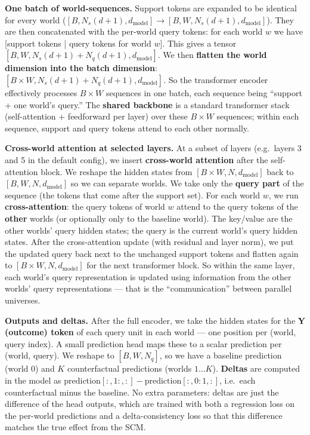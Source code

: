 \documentclass[12pt]{article}
\begin{document}
\textbf{One batch of world-sequences.} Support tokens are expanded to be identical for every world ($[B, N_s(d+1), d_{\text{model}}] \to [B, W, N_s(d+1), d_{\text{model}}]$). They are then concatenated with the per-world query tokens: for each world $w$ we have [support tokens | query tokens for world $w$]. This gives a tensor $[B, W, N_s(d+1) + N_q(d+1), d_{\text{model}}]$. We then \textbf{flatten the world dimension into the batch dimension}: $[B \times W, N_s(d+1) + N_q(d+1), d_{\text{model}}]$. So the transformer encoder effectively processes $B \times W$ sequences in one batch, each sequence being ``support + one world's query.'' The \textbf{shared backbone} is a standard transformer stack (self-attention + feedforward per layer) over these $B \times W$ sequences; within each sequence, support and query tokens attend to each other normally.

\textbf{Cross-world attention at selected layers.} At a subset of layers (e.g.\ layers 3 and 5 in the default config), we insert \textbf{cross-world attention} after the self-attention block. We reshape the hidden states from $[B \times W, N, d_{\text{model}}]$ back to $[B, W, N, d_{\text{model}}]$ so we can separate worlds. We take only the \textbf{query part} of the sequence (the tokens that come after the support set). For each world $w$, we run \textbf{cross-attention}: the query tokens of world $w$ attend to the query tokens of the \textbf{other} worlds (or optionally only to the baseline world). The key/value are the other worlds' query hidden states; the query is the current world's query hidden states. After the cross-attention update (with residual and layer norm), we put the updated query back next to the unchanged support tokens and flatten again to $[B \times W, N, d_{\text{model}}]$ for the next transformer block. So within the same layer, each world's query representation is updated using information from the other worlds' query representations --- that is the ``communication'' between parallel universes.

\textbf{Outputs and deltas.} After the full encoder, we take the hidden states for the \textbf{Y (outcome) token} of each query unit in each world --- one position per (world, query index). A small prediction head maps these to a scalar prediction per (world, query). We reshape to $[B, W, N_q]$, so we have a baseline prediction (world 0) and $K$ counterfactual predictions (worlds $1 \ldots K$). \textbf{Deltas} are computed in the model as $\text{prediction}[:, 1:, :] - \text{prediction}[:, 0:1, :]$, i.e.\ each counterfactual minus the baseline. No extra parameters: deltas are just the difference of the head outputs, which are trained with both a regression loss on the per-world predictions and a delta-consistency loss so that this difference matches the true effect from the SCM.
\end{document}
